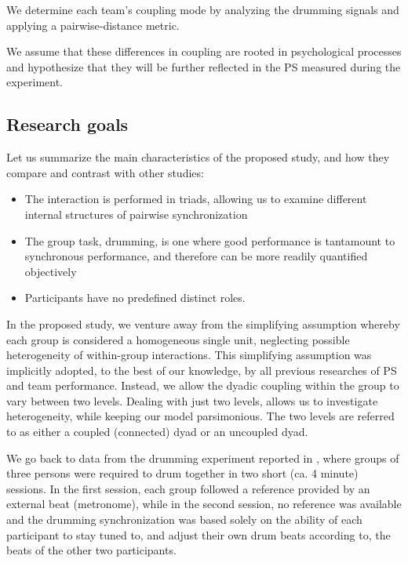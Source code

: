 \documentclass[a4paper, 11pt]{report}      %
\begin{document}
We determine each team's coupling mode by analyzing the drumming signals and applying a pairwise-distance metric.

We assume that these differences in coupling are rooted in psychological processes and hypothesize that they will be further reflected in the PS measured during the experiment.


\subsection{Research goals}

Let us summarize the main characteristics of the proposed study, and how they compare and contrast with other studies:
\begin{itemize}
    \item The interaction is performed in triads, allowing us to examine different internal structures of pairwise synchronization
    \item The group task, drumming, is one where good performance is tantamount to synchronous performance, and therefore can be more readily quantified objectively
    \item Participants have no predefined distinct roles.
\end{itemize}



In the proposed study, we venture away from the simplifying assumption whereby each group is considered a homogeneous single unit, neglecting possible heterogeneity of within-group interactions. This simplifying assumption was implicitly adopted, to the best of our knowledge, by all previous researches of PS and team performance. Instead, we allow the dyadic coupling within the group to vary between two levels. Dealing with just two levels, allows us to investigate heterogeneity, while keeping our model parsimonious. The two levels are referred to as either a coupled (connected) dyad or an uncoupled dyad. 

We go back to data from the drumming experiment reported in \citet{gordon2020physio}, where groups of three persons were required to drum together in two short (ca. 4 minute) sessions. In the first session, each group followed a reference provided by an external beat (metronome), while in the second session, no reference was available and the drumming synchronization was based solely on the ability of each participant to stay tuned to, and adjust their own drum beats according to, the beats of the other two participants. 
\end{document}
